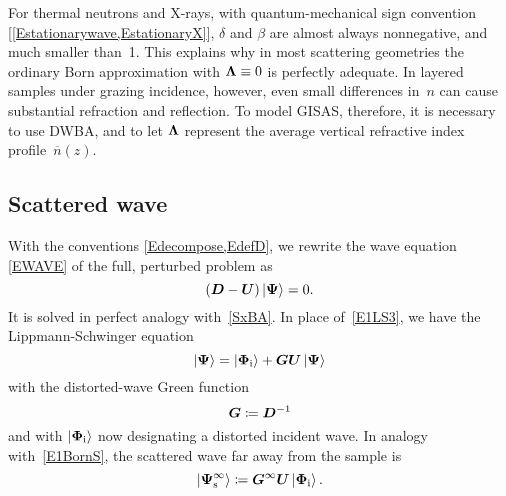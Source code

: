 For thermal neutrons and X-rays,
with quantum-mechanical sign convention [\cref{Estationarywave,EstationaryX}],
$\delta$ and $\beta$ are almost always nonnegative,
%
%
and much smaller than~1.
This explains why in most scattering geometries
%
the ordinary Born approximation
%
with $\bm{\Lambda}\equiv0$ is perfectly adequate.
In layered samples under grazing incidence,
%
however, even small differences in~$n$ can cause substantial
refraction and reflection.
%
%
To model GISAS, therefore,
it is necessary to use DWBA,
%
and to let $\bm{\Lambda}$ represent
the average vertical refractive index profile~$\overline{n}(z)$.
%

\subsection{Scattered wave}\label{SxDWBA}

With the conventions \cref{Edecompose,EdefD},
we rewrite the wave equation \cref{EWAVE} of the full, perturbed problem as
\begin{equation}\label{EWave3}
  (\TD-\TU)\ket{\v\Psi} = 0.
\end{equation}
It is solved in perfect analogy with~\cref{SxBA}.
In place of~\cref{E1LS3}, we have the Lippmann-Schwinger equation
%
\begin{equation}\label{ELS3}
   \ket{\v\Psi} = \ket{\v\Phi_\si} + \TG\TU\ket{\v\Psi}
\end{equation}
with the distorted-wave Green function
%
%
\begin{equation}\label{EdefG}
   \TG \coloneqq \TD^{-1}
\end{equation}
and with $\ket{\bm{\Phi}_{\text{i}}}$ now designating a distorted incident wave.
In analogy with~\cref{E1BornS}, the scattered wave far away from the sample is
%
%
\begin{equation}\label{EBornS}
  \ket{\v\Psi^\infty_\text{s}}
  \coloneqq \TG^\infty\TU\ket{\v\Phi_\si}.
\end{equation}
%
%

